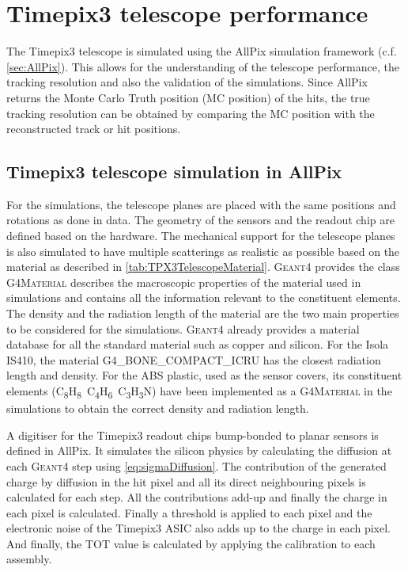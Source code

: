 \section{Timepix3 telescope performance}\label{sec:telescopePerformance}

The Timepix3 telescope is simulated using the AllPix simulation
framework (c.f. \cref{sec:AllPix}). This allows for the understanding
of the telescope performance, the tracking resolution and also the
validation of the simulations. Since AllPix returns the Monte Carlo
Truth position (MC position) of the hits, the true tracking resolution
can be obtained by comparing the MC position with the reconstructed
track or hit positions.  

\subsection{Timepix3 telescope simulation in AllPix}
For the simulations, the telescope planes are placed with the same
positions and rotations as done in data. The geometry of the sensors
and the readout chip are defined based on the hardware. The mechanical
support for the telescope planes is also simulated to have multiple
scatterings as realistic as possible based on the material as
described in \cref{tab:TPX3TelescopeMaterial}. \textsc{Geant4}
provides the class \textsc{G4Material} describes the macroscopic
properties of the material used in simulations and contains all the
information relevant to the constituent elements. The density and the
radiation length of the material are the two main properties to be
considered for the simulations. \textsc{Geant4} already provides a
material database for all the standard material such as copper and
silicon. For the Isola IS410, the material G4\_BONE\_COMPACT\_ICRU has
the closest radiation length and density. For the ABS plastic, used as
the sensor covers, its constituent elements
(C\textsubscript{8}H\textsubscript{8}~C\textsubscript{4}H\textsubscript{6}~C\textsubscript{3}H\textsubscript{3}N)
have been implemented as a \textsc{G4Material} in the simulations to
obtain the correct density and radiation length.


A digitiser for the Timepix3 readout chips bump-bonded to planar
sensors is defined in AllPix. It simulates the silicon physics by
calculating the diffusion at each \textsc{Geant4} step using
\cref{eq:sigmaDiffusion}. The contribution of the generated charge by
diffusion in the hit pixel and all its direct neighbouring pixels is
calculated for each step. All the contributions add-up and finally the
charge in each pixel is calculated. Finally a threshold is applied to
each pixel and the electronic noise of the Timepix3 ASIC also adds up
to the charge in each pixel. And finally, the TOT value is calculated
by applying the calibration to each assembly.

